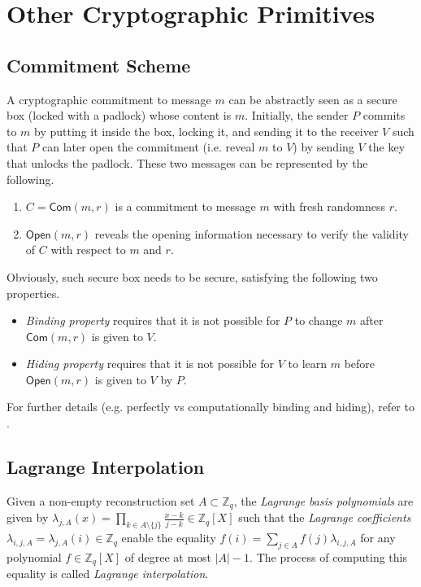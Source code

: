 \documentclass[letterpaper,twocolumn,10pt]{article}
\theoremstyle{definition}
\theoremstyle{remark}
\begin{document}
\section{Other Cryptographic Primitives}
\subsection{Commitment Scheme}
\label{appendix:commitment}
A cryptographic commitment \cite{blum1983coin} to message $m$ can be abstractly seen as a secure box (locked with a padlock) whose content is $m$. Initially, the sender $P$ commits to $m$ by putting it inside the box, locking it, and sending it to the receiver $V$ such that $P$ can later open the commitment (i.e. reveal $m$ to $V$) by sending $V$ the key that unlocks the padlock. These two messages can be represented by the following.
\begin{enumerate}
\item $C = \mathsf{Com}(m, r)$ is a commitment to message $m$ with fresh randomness $r$.
\item $\mathsf{Open}(m, r)$ reveals the opening information necessary to verify the validity of $C$ with respect to $m$ and $r$.
\end{enumerate}

Obviously, such secure box needs to be secure, satisfying the following two properties.
\begin{itemize}
\item \textit{Binding property} requires that it is not possible for $P$ to change $m$ after $\mathsf{Com}(m, r)$ is given to $V$.
\item \textit{Hiding property} requires that it is not possible for $V$ to learn $m$ before $\mathsf{Open}(m, r)$ is given to $V$ by $P$.
\end{itemize}

For further details (e.g. perfectly vs computationally binding and hiding), refer to \cite{damgaard1998commitment}.

\subsection{Lagrange Interpolation}
Given a non-empty reconstruction set $A \subset \mathbb{Z}_q$, the \textit{Lagrange basis polynomials} are given by $\lambda_{j, A}(x) = \prod_{k \in A \setminus \{j\}} \frac{x - k}{j - k} \in \mathbb{Z}_q[X]$ such that the \textit{Lagrange coefficients} $\lambda_{i, j, A} = \lambda_{j, A}(i) \in \mathbb{Z}_q$ enable the equality $f(i) = \sum_{j \in A} f(j) \lambda_{i, j, A}$ for any polynomial $f \in \mathbb{Z}_q[X]$ of degree at most $|A| - 1$. The process of computing this equality is called \textit{Lagrange interpolation}.
\end{document}
